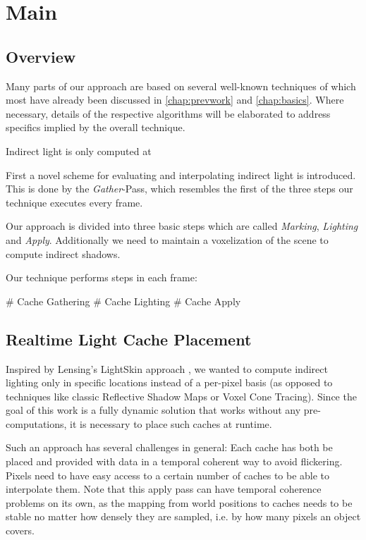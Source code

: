 \documentclass[thesis.tex]{subfiles}
\begin{document}
\chapter{Main}\label{chap:basics}

\section{Overview}

Many parts of our approach are based on several well-known techniques of which most have already been discussed in \autoref{chap:prevwork} and \autoref{chap:basics}.
Where necessary, details of the respective algorithms will be elaborated to address specifics implied by the overall technique.

Indirect light is only computed at 

First a novel scheme for evaluating and interpolating indirect light is introduced.
This is done by the \emph{Gather}-Pass, which resembles the first of the three steps our technique executes every frame.

Our approach is divided into three basic steps which are called \emph{Marking}, \emph{Lighting} and \emph{Apply}.
Additionally we need to maintain a voxelization of the scene to compute indirect shadows. 


Our technique performs steps in each frame:
\begin{easylist}[itemize]
# Cache Gathering
# Cache Lighting
# Cache Apply
\end{easylist}


\section{Realtime Light Cache Placement}

Inspired by Lensing's LightSkin approach \cite{bib:LightskinPaper}, we wanted to compute indirect lighting only in specific locations instead of a per-pixel basis (as opposed to techniques like classic Reflective Shadow Maps or Voxel Cone Tracing).
Since the goal of this work is a fully dynamic solution that works without any pre-computations, it is necessary to place such caches at runtime.

Such an approach has several challenges in general:
Each cache has both be placed and provided with data in a temporal coherent way to avoid flickering.
Pixels need to have easy access to a certain number of caches to be able to interpolate them.
Note that this apply pass can have temporal coherence problems on its own, as the mapping from world positions to caches needs to be stable no matter how densely they are sampled, i.e. by how many pixels an object covers.
\end{document}
